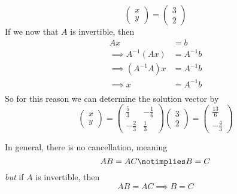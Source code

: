 \begin{exm}
\begin{equation*}
\begin{pmatrix}
			x \\
			y
		\end{pmatrix}=
		\begin{pmatrix}
			3 \\
			2
		\end{pmatrix}
	\end{equation*}
	If we now that $A$ is invertible, then
	\begin{align*}
		Ax                  & = b       \\
		\implies A^{-1}(Ax) & = A^{-1}b \\
		\implies (A^{-1}A)x & = A^{-1}b \\
		\implies          x & = A^{-1}b \\
	\end{align*}
	So for this reason we can determine the solution vector by
	\begin{equation*}
		\begin{pmatrix}
			x \\y
		\end{pmatrix}=
		\begin{pmatrix}
			\frac{5}{3}  & -\frac{1}{6} \\[4pt]
			-\frac{2}{3} & \frac{1}{3}
		\end{pmatrix}\begin{pmatrix}
			3 \\2
		\end{pmatrix}=
		\begin{pmatrix}
			\frac{13}{6} \\[4pt]
			-\frac{4}{3}
		\end{pmatrix}
	\end{equation*}
\end{exm}

\begin{rem}\label{rem-invertible-matrix-implication}
	In general, there is no cancellation, meaning
	\begin{equation*}
		AB=AC \notimplies B=C
	\end{equation*}
	\textit{but} if $A$ is invertible, then
	\begin{equation*}
		AB=AC \implies B=C
	\end{equation*}
\end{rem}

